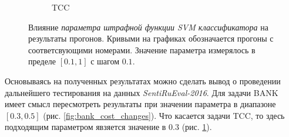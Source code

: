 \begin{figure}[!htp]
\begin{subfigure}[b]{0.45\textwidth}
        \caption{TCC}
        \label{fig:ttk_cost_changes}
    \end{subfigure}
    \caption{
        Влияние {\it параметра штрафной функции SVM классификатора}
        на результаты прогонов.
        Кривыми на графиках обозначается прогоны с соответсвующими номерами.
        Значение параметра измерялось в пределе $[0.1, 1]$ с шагом $0.1$.
    }
    \label{fig:cost}
\end{figure}

Основываясь на полученных результатах можно сделать вывод о проведении дальнейшего
тестирования на данных {\it SentiRuEval-2016}.
Для задачи BANK имеет смысл пересмотреть результаты при значении параметра в
диапазоне $[0.3, 0.5]$ (рис. \ref{fig:bank_cost_changes}).
Что касается задачи TCC, то здесь подходящим параметром явзяется значение в $0.3$
(рис. \ref{fig:ttk_cost_changes}).
